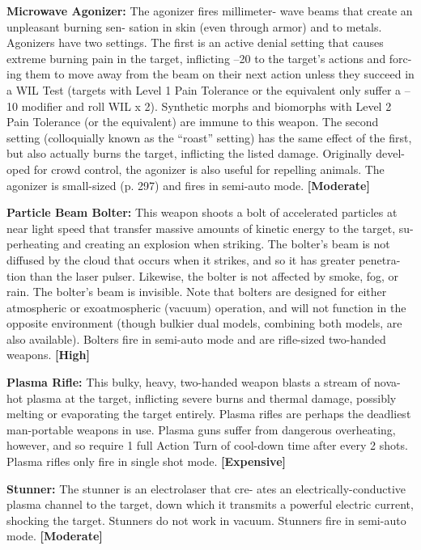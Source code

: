\textbf{Microwave Agonizer: }The agonizer fires millimeter-
wave beams that create an unpleasant burning sen-
sation in skin (even through armor) and to metals. 
Agonizers have two settings. The first is an active 
denial setting that causes extreme burning pain in the 
target, inflicting –20 to the target's actions and forc-
ing them to move away from the beam on their next 
action unless they succeed in a WIL Test (targets with 
Level 1 Pain Tolerance or the equivalent only suffer 
a –10 modifier and roll WIL x 2). Synthetic morphs 
and biomorphs with Level 2 Pain Tolerance (or the 
equivalent) are immune to this weapon. The second 
setting (colloquially known as the ``roast'' setting) has 
the same effect of the first, but also actually burns the 
target, inflicting the listed damage. Originally devel-
oped for crowd control, the agonizer is also useful for 
repelling animals. The agonizer is small-sized (p. 297) 
and fires in semi-auto mode. \textbf{[Moderate]}

\textbf{Particle Beam Bolter:} This weapon shoots a bolt of 
accelerated particles at near light speed that transfer 
massive amounts of kinetic energy to the target, su-
perheating and creating an explosion when striking. 
The bolter's beam is not diffused by the cloud that 
occurs when it strikes, and so it has greater penetra-
tion than the laser pulser. Likewise, the bolter is not 
affected by smoke, fog, or rain. The bolter's beam is 
invisible. Note that bolters are designed for either 
atmospheric or exoatmospheric (vacuum) operation, 
and will not function in the opposite environment 
(though bulkier dual models, combining both models, 
are also available). Bolters fire in semi-auto mode and 
are rifle-sized two-handed weapons. \textbf{[High]}

\textbf{Plasma Rifle:} This bulky, heavy, two-handed 
weapon blasts a stream of nova-hot plasma at the 
target, inflicting severe burns and thermal damage, 
possibly melting or evaporating the target entirely. 
Plasma rifles are perhaps the deadliest man-portable 
weapons in use. Plasma guns suffer from dangerous 
overheating, however, and so require 1 full Action 
Turn of cool-down time after every 2 shots. Plasma 
rifles only fire in single shot mode. \textbf{[Expensive]}

\textbf{Stunner:} The stunner is an electrolaser that cre-
ates an electrically-conductive plasma channel to the 
target, down which it transmits a powerful electric 
current, shocking the target. Stunners do not work in 
vacuum. Stunners fire in semi-auto mode. \textbf{[Moderate]}

